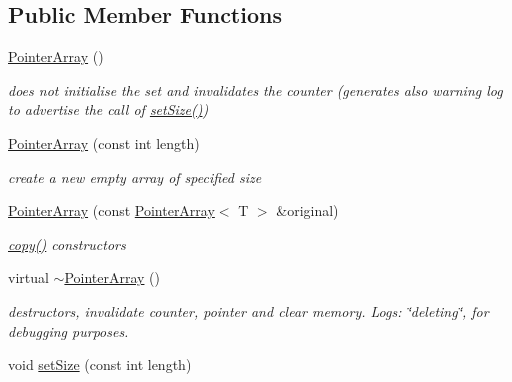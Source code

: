 \subsection*{Public Member Functions}
\begin{DoxyCompactItemize}
\item 
\hypertarget{classparray_1_1PointerArray_ab506b284822d1e013813579e06893797}{\hyperlink{classparray_1_1PointerArray_ab506b284822d1e013813579e06893797}{Pointer\-Array} ()}\label{classparray_1_1PointerArray_ab506b284822d1e013813579e06893797}

\begin{DoxyCompactList}\small\item\em does not initialise the set and invalidates the counter (generates also warning log to advertise the call of \hyperlink{classparray_1_1PointerArray_ae3fb455ddc80180a3a7b130cb2c4d903}{set\-Size()}) \end{DoxyCompactList}\item 
\hypertarget{classparray_1_1PointerArray_a4e39d7adf15e94c02dfe2662c181f0c6}{\hyperlink{classparray_1_1PointerArray_a4e39d7adf15e94c02dfe2662c181f0c6}{Pointer\-Array} (const int length)}\label{classparray_1_1PointerArray_a4e39d7adf15e94c02dfe2662c181f0c6}

\begin{DoxyCompactList}\small\item\em create a new empty array of specified size \end{DoxyCompactList}\item 
\hypertarget{classparray_1_1PointerArray_ab763be75c142552337e545ca0a27d93e}{\hyperlink{classparray_1_1PointerArray_ab763be75c142552337e545ca0a27d93e}{Pointer\-Array} (const \hyperlink{classparray_1_1PointerArray}{Pointer\-Array}$<$ T $>$ \&original)}\label{classparray_1_1PointerArray_ab763be75c142552337e545ca0a27d93e}

\begin{DoxyCompactList}\small\item\em \hyperlink{classparray_1_1PointerArray_a3010540e156076377ffd4428b05e1ac2}{copy()} constructors \end{DoxyCompactList}\item 
\hypertarget{classparray_1_1PointerArray_a3b59a3fe4f7e83d83231d9daf8210333}{virtual \hyperlink{classparray_1_1PointerArray_a3b59a3fe4f7e83d83231d9daf8210333}{$\sim$\-Pointer\-Array} ()}\label{classparray_1_1PointerArray_a3b59a3fe4f7e83d83231d9daf8210333}

\begin{DoxyCompactList}\small\item\em destructors, invalidate counter, pointer and clear memory. Logs\-: \char`\"{}deleting\char`\"{}, for debugging purposes. \end{DoxyCompactList}\item 
\hypertarget{classparray_1_1PointerArray_ae3fb455ddc80180a3a7b130cb2c4d903}{void \hyperlink{classparray_1_1PointerArray_ae3fb455ddc80180a3a7b130cb2c4d903}{set\-Size} (const int length)}\label{classparray_1_1PointerArray_ae3fb455ddc80180a3a7b130cb2c4d903}


\end{DoxyCompactItemize}
